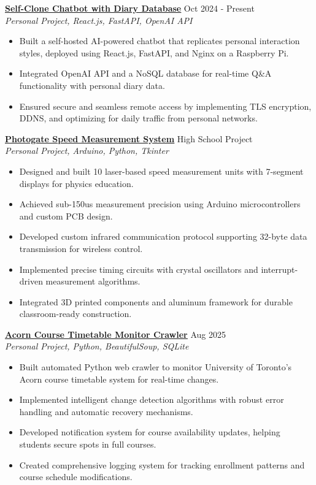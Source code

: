 \documentclass[letterpaper,10pt]{article}
\begin{document}
\vspace{0.3cm}
\noindent\href{https://chengyongkang.me/chat}{\uline{
\textbf{Self-Clone Chatbot with Diary Database}}} \hfill Oct 2024 - Present\\
\textit{Personal Project, React.js, FastAPI, OpenAI API}
\begin{itemize}[leftmargin=0.2in]
    \item Built a self-hosted AI-powered chatbot that replicates personal interaction styles, deployed using React.js, FastAPI, and Nginx on a Raspberry Pi.
    \item Integrated OpenAI API and a NoSQL database for real-time Q\&A functionality with personal diary data.
    \item Ensured secure and seamless remote access by implementing TLS encryption, DDNS, and optimizing for daily traffic from personal networks.
\end{itemize}

\vspace{0.2cm}
\noindent\href{https://github.com/Ken-2511/Photogate}{\uline{
    \textbf{Photogate Speed Measurement System}}} \hfill High School Project\\
\textit{Personal Project, Arduino, Python, Tkinter}
\begin{itemize}[leftmargin=0.2in]
    \item Designed and built 10 laser-based speed measurement units with 7-segment displays for physics education.
    \item Achieved sub-150us measurement precision using Arduino microcontrollers and custom PCB design.
    \item Developed custom infrared communication protocol supporting 32-byte data transmission for wireless control.
    \item Implemented precise timing circuits with crystal oscillators and interrupt-driven measurement algorithms.
    \item Integrated 3D printed components and aluminum framework for durable classroom-ready construction.
\end{itemize}

\vspace{0.3cm}
\noindent\href{https://github.com/Ken-2511/AcornCarwler}{\uline{
\textbf{Acorn Course Timetable Monitor Crawler}}} \hfill Aug 2025\\
\textit{Personal Project, Python, BeautifulSoup, SQLite}
\begin{itemize}[leftmargin=0.2in]
    \item Built automated Python web crawler to monitor University of Toronto's Acorn course timetable system for real-time changes.
    \item Implemented intelligent change detection algorithms with robust error handling and automatic recovery mechanisms.
    \item Developed notification system for course availability updates, helping students secure spots in full courses.
    \item Created comprehensive logging system for tracking enrollment patterns and course schedule modifications.
\end{itemize}
\end{document}
